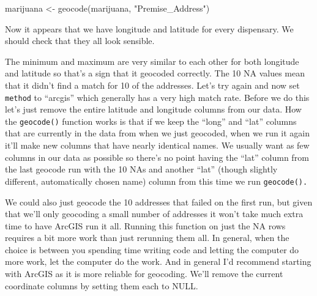 \documentclass[
]{krantz}
\makeatletter
\newenvironment{Shaded}{\begin{snugshade}}{\end{snugshade}}
\newcommand{\CommentTok}[1]{\textcolor[rgb]{0.37,0.37,0.37}{\textit{#1}}}
\newcommand{\FunctionTok}[1]{\textcolor[rgb]{0,0,0}{#1}}
\newcommand{\NormalTok}[1]{#1}
\newcommand{\OtherTok}[1]{\textcolor[rgb]{0.37,0.37,0.37}{#1}}
\newcommand{\SpecialCharTok}[1]{\textcolor[rgb]{0,0,0}{#1}}
\newcommand{\StringTok}[1]{\textcolor[rgb]{0.5,0.5,0.5}{#1}}
\newenvironment{kframe}{%
\medskip{}
\setlength{\fboxsep}{.8em}
 \def\at@end@of@kframe{}%
 \ifinner\ifhmode%
  \def\at@end@of@kframe{\end{minipage}}%
  \begin{minipage}{\columnwidth}%
 \fi\fi%
 \def\FrameCommand##1{\hskip\@totalleftmargin \hskip-\fboxsep
 \colorbox{shadecolor}{##1}\hskip-\fboxsep
     \hskip-\linewidth \hskip-\@totalleftmargin \hskip\columnwidth}%
 \MakeFramed {\advance\hsize-\width
   \@totalleftmargin\z@ \linewidth\hsize
   \@setminipage}}%
 {\par\unskip\endMakeFramed%
 \at@end@of@kframe}
\renewenvironment{Shaded}{\begin{kframe}}{\end{kframe}}
\makeatother
\begin{document}
\begin{Shaded}
\begin{Highlighting}[]
\NormalTok{marijuana }\OtherTok{\textless{}{-}} \FunctionTok{geocode}\NormalTok{(marijuana, }\StringTok{"Premise\_Address"}\NormalTok{)}
\end{Highlighting}
\end{Shaded}

Now it appears that we have longitude and latitude for every dispensary. We should check that they all look sensible.

\begin{Shaded}
\end{Shaded}

\begin{Shaded}
\end{Shaded}

The minimum and maximum are very similar to each other for both longitude and latitude so that's a sign that it geocoded correctly. The 10 NA values mean that it didn't find a match for 10 of the addresses. Let's try again and now set \texttt{method} to ``arcgis'' which generally has a very high match rate. Before we do this let's just remove the entire latitude and longitude columns from our data. How the \texttt{geocode()} function works is that if we keep the ``long'' and ``lat'' columns that are currently in the data from when we just geocoded, when we run it again it'll make new columns that have nearly identical names. We usually want as few columns in our data as possible so there's no point having the ``lat'' column from the last geocode run with the 10 NAs and another ``lat'' (though slightly different, automatically chosen name) column from this time we run \texttt{geocode().}

We could also just geocode the 10 addresses that failed on the first run, but given that we'll only geocoding a small number of addresses it won't take much extra time to have ArcGIS run it all. Running this function on just the NA rows requires a bit more work than just rerunning them all. In general, when the choice is between you spending time writing code and letting the computer do more work, let the computer do the work. And in general I'd recommend starting with ArcGIS as it is more reliable for geocoding. We'll remove the current coordinate columns by setting them each to NULL.
\end{document}
